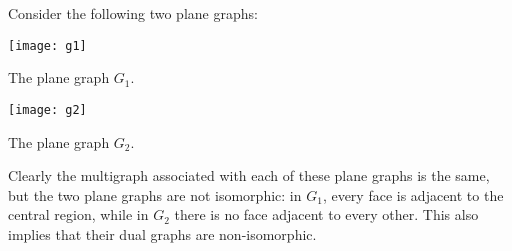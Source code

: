 \documentclass[12pt]{article}
\begin{document}
Consider the following two plane graphs:
\begin{center}
\texttt{[image: g1]}

The plane graph $G_1$.
\end{center}
\begin{center}
\texttt{[image: g2]}

The plane graph $G_2$.
\end{center}
Clearly the multigraph associated with each of these plane graphs is the same, but the two plane graphs are not isomorphic: in $G_1$, every face is adjacent to the central region, while in $G_2$ there is no face adjacent to every other. This also implies that their dual graphs are non-isomorphic.
\end{document}
